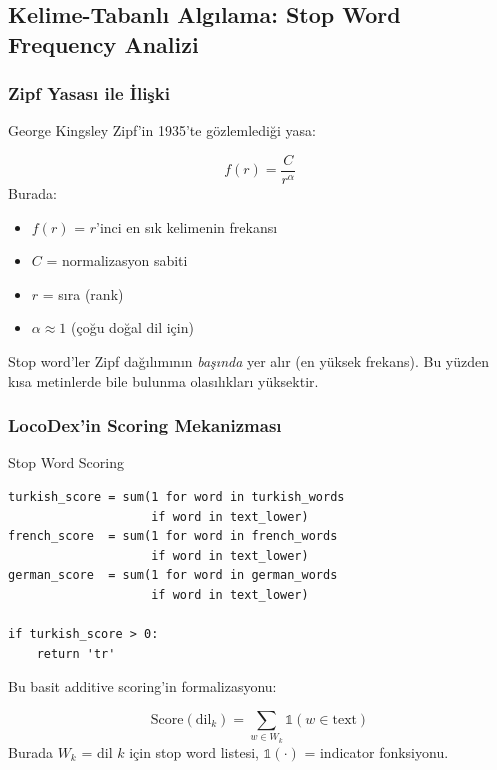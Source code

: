 \subsection{Kelime-Tabanl{\i} Alg{\i}lama: Stop Word Frequency Analizi}

\subsubsection{Zipf Yasas{\i} ile \.{I}li\c{s}ki}

George Kingsley Zipf'in 1935'te g\"{o}zlemledi\u{g}i yasa:

\begin{formulbox}
\begin{equation}
\label{eq:zipf}
f(r) = \frac{C}{r^{\alpha}}
\end{equation}
Burada:
\begin{itemize}[leftmargin=1.5em]
  \item $f(r)$ = $r$'inci en s{\i}k kelimenin frekans{\i}
  \item $C$ = normalizasyon sabiti
  \item $r$ = s{\i}ra (rank)
  \item $\alpha \approx 1$ (\c{c}o\u{g}u do\u{g}al dil i\c{c}in)
\end{itemize}
Stop word'ler Zipf da\u{g}{\i}l{\i}m{\i}n{\i}n \emph{ba\c{s}{\i}nda} yer al{\i}r (en y\"{u}ksek frekans). Bu y\"{u}zden k{\i}sa metinlerde bile bulunma olas{\i}l{\i}klar{\i} y\"{u}ksektir.
\end{formulbox}

\subsubsection{LocoDex'in Scoring Mekanizmas{\i}}

\begin{kodref}{Stop Word Scoring}
\begin{lstlisting}
turkish_score = sum(1 for word in turkish_words
                    if word in text_lower)
french_score  = sum(1 for word in french_words
                    if word in text_lower)
german_score  = sum(1 for word in german_words
                    if word in text_lower)

if turkish_score > 0:
    return 'tr'
\end{lstlisting}
\end{kodref}

Bu basit additive scoring'in formalizasyonu:

\begin{formulbox}
\begin{equation}
\label{eq:stopword-score}
\mathrm{Score}(\text{dil}_k) = \sum_{w \in W_k} \mathbb{1}(w \in \text{text})
\end{equation}
Burada $W_k$ = dil $k$ i\c{c}in stop word listesi, $\mathbb{1}(\cdot)$ = indicator fonksiyonu.
\end{formulbox}

